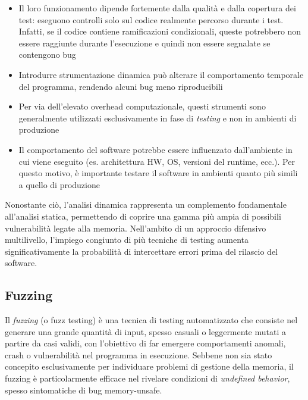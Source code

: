 \begin{itemize}
  \item Il loro funzionamento dipende fortemente dalla qualità e dalla copertura
    dei test: eseguono controlli solo sul codice realmente percorso durante i
    test. Infatti, se il codice contiene ramificazioni condizionali, queste potrebbero
    non essere raggiunte durante l'esecuzione e quindi non essere segnalate se contengono
    bug

  \item Introdurre strumentazione dinamica può alterare il comportamento temporale
    del programma, rendendo alcuni bug meno riproducibili

  \item Per via dell'elevato overhead computazionale, questi strumenti sono
    generalmente utilizzati esclusivamente in fase di \textit{testing} e non in ambienti
    di produzione

  \item Il comportamento del software potrebbe essere influenzato dall'ambiente in
    cui viene eseguito (es. architettura HW, OS, versioni del runtime, ecc.). Per
    questo motivo, è importante testare il software in ambienti quanto più
    simili a quello di produzione
\end{itemize}

Nonostante ciò, l'analisi dinamica rappresenta un complemento fondamentale all'analisi
statica, permettendo di coprire una gamma più ampia di possibili vulnerabilità
legate alla memoria. Nell'ambito di un approccio difensivo multilivello, l'impiego
congiunto di più tecniche di testing aumenta significativamente la probabilità
di intercettare errori prima del rilascio del software.

\subsection{Fuzzing}
\label{sec:fuzzing}

Il \textit{fuzzing} (o fuzz testing) è una tecnica di testing automatizzato che
consiste nel generare una grande quantità di input, spesso casuali o leggermente
mutati a partire da casi validi, con l'obiettivo di far emergere comportamenti
anomali, crash o vulnerabilità nel programma in esecuzione. Sebbene non sia
stato concepito esclusivamente per individuare problemi di gestione della
memoria, il fuzzing è particolarmente efficace nel rivelare condizioni di \textit{undefined
behavior}, spesso sintomatiche di bug memory-unsafe.

